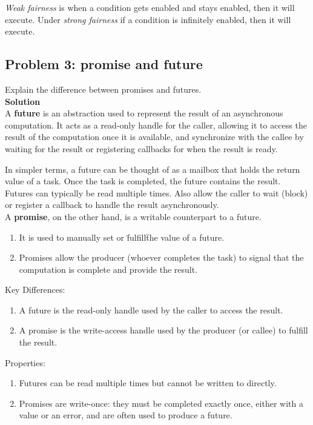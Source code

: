\textit{Weak fairness} is when a condition gets enabled and stays enabled, then it will execute. 
Under \textit{strong fairness} if a condition is infinitely enabled, then it will execute. 

\subsection{Problem 3: promise and future}

Explain the difference between promises and futures. \\

\textbf{Solution} \\

A \textbf{future} is an abstraction used to represent the result of an asynchronous computation. 
It acts as a read-only handle for the caller, allowing it to access the result of the computation once it is available, 
and synchronize with the callee by waiting for the result or registering callbacks for when the result is ready.

In simpler terms, a future can be thought of as a mailbox that holds the return value of a task. 
Once the task is completed, the future contains the result. Futures can typically be read multiple times.
Also allow the caller to wait (block) or register a callback to handle the result asynchronously. \\

A \textbf{promise}, on the other hand, is a writable counterpart to a future. 
\begin{enumerate}
    \item It is used to manually set or \"fulfill\" the value of a future.
    \item Promises allow the producer (whoever completes the task) to signal that the computation is complete and provide the result.
\end{enumerate}

Key Differences:
\begin{enumerate}
    \item A future is the read-only handle used by the caller to access the result.
    \item A promise is the write-access handle used by the producer (or callee) to fulfill the result.
\end{enumerate}

Properties:
\begin{enumerate}
    \item Futures can be read multiple times but cannot be written to directly.
    \item Promises are write-once: they must be completed exactly once, either with a value or an error, and are often used to produce a future. 
\end{enumerate}

